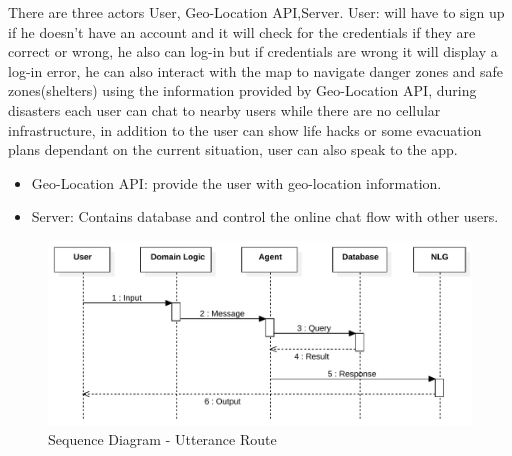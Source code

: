 \documentclass{scrreprt}
\begin{document}
There are three actors User, Geo-Location API,Server. User: will have to sign up if he doesn't have an account and it will check for the credentials if they are correct or wrong, he also can log-in but if credentials are wrong it will display a log-in error,
he can also interact with the map to navigate danger zones and safe zones(shelters) using the information provided by Geo-Location API, during disasters each user can chat to nearby users while there are no cellular infrastructure, in addition to the user can show life hacks or some evacuation plans dependant on the current situation, user can also speak to the app.
\begin{itemize}
    \item Geo-Location API: provide the user with geo-location information.
    \item Server: Contains database and control the online chat flow with other users.
\end{itemize}


\clearpage
\begin{figure}[ht!]
    \centering
    \includegraphics[angle=90, height=.95\textheight]{img3/SequenceDiagram2.pdf}
    \caption{Sequence Diagram - Utterance Route}
    \label{fig:sequence2}
\end{figure}




\clearpage
\end{document}

